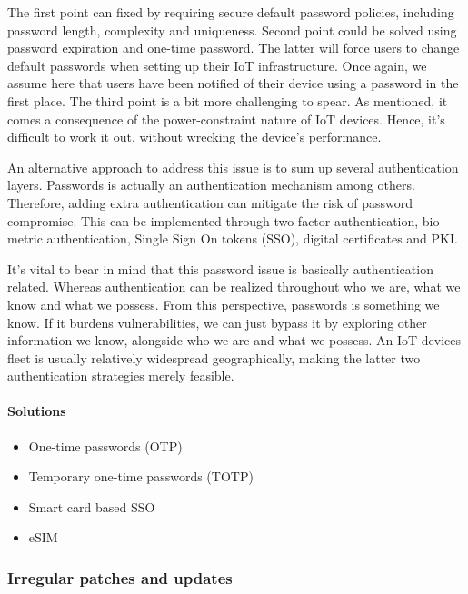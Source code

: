The first point can fixed by requiring secure default password policies, including password length, complexity and uniqueness. Second point could be solved using password expiration and one-time password. The latter will force users to change default passwords when setting up their IoT infrastructure. Once again, we assume here that users have been notified of their device using a password in the first place. The third point is a bit more challenging to spear. As mentioned, it comes a consequence of the power-constraint nature of IoT devices. Hence, it’s difficult to work it out, without wrecking the device’s performance.

An alternative approach to address this issue is to sum up several authentication layers. Passwords is actually an authentication mechanism among others. Therefore, adding extra authentication can mitigate the risk of password compromise. This can be implemented through two-factor authentication, bio-metric authentication, Single Sign On tokens (SSO), digital certificates and PKI. 

It’s vital to bear in mind that this password issue is basically authentication related. Whereas authentication can be realized throughout who we are, what we know and what we possess. From this perspective, passwords is something we know. If it burdens vulnerabilities, we can just bypass it by exploring other information we know, alongside who we are and what we possess. An IoT devices fleet is usually relatively widespread geographically, making the  latter two authentication strategies merely feasible.

\paragraph{Solutions}

\begin{itemize}
	\item One-time passwords (OTP)
	\item Temporary one-time passwords (TOTP)
	\item Smart card based SSO
	\item eSIM
\end{itemize}


\subsubsection{Irregular patches and updates}

